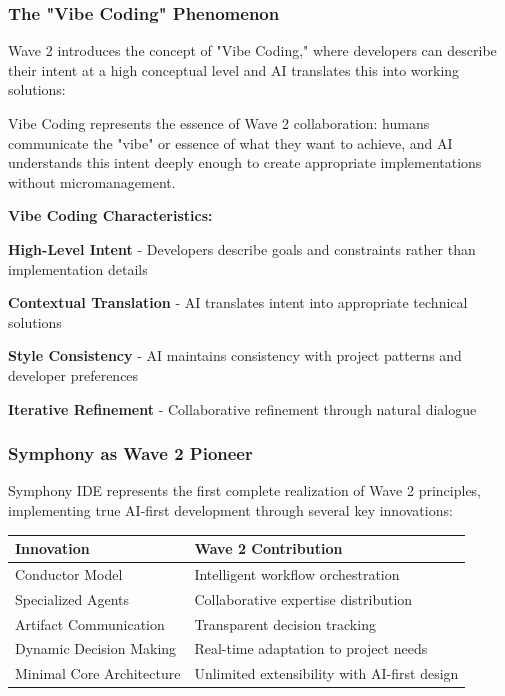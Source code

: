 \subsubsection{The "Vibe Coding" Phenomenon}

Wave 2 introduces the concept of "Vibe Coding," where developers can describe their intent at a high conceptual level and AI translates this into working solutions:

\begin{successbox}
Vibe Coding represents the essence of Wave 2 collaboration: humans communicate the "vibe" or essence of what they want to achieve, and AI understands this intent deeply enough to create appropriate implementations without micromanagement.
\end{successbox}

\textbf{Vibe Coding Characteristics:}

\begin{compactlist}
    \item \textbf{High-Level Intent} - Developers describe goals and constraints rather than implementation details
    \item \textbf{Contextual Translation} - AI translates intent into appropriate technical solutions
    \item \textbf{Style Consistency} - AI maintains consistency with project patterns and developer preferences
    \item \textbf{Iterative Refinement} - Collaborative refinement through natural dialogue
\end{compactlist}

\subsubsection{Symphony as Wave 2 Pioneer}

Symphony IDE represents the first complete realization of Wave 2 principles, implementing true AI-first development through several key innovations:

\begin{center}
\begin{tabular}{@{}ll@{}}
\toprule
\textbf{Innovation} & \textbf{Wave 2 Contribution} \\
\midrule
Conductor Model & Intelligent workflow orchestration \\
Specialized Agents & Collaborative expertise distribution \\
Artifact Communication & Transparent decision tracking \\
Dynamic Decision Making & Real-time adaptation to project needs \\
Minimal Core Architecture & Unlimited extensibility with AI-first design \\
\bottomrule
\end{tabular}
\label{tab:symphony-wave2}
\end{center}

